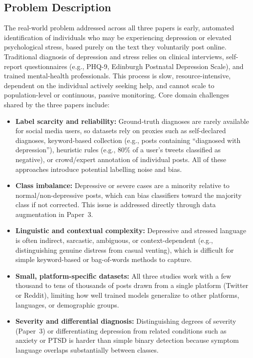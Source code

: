 \documentclass[a4paper,12pt]{article}
\begin{document}
\subsection{Problem Description}
The real-world problem addressed across all three papers is early, automated identification of individuals who may be experiencing depression or elevated psychological stress, based purely on the text they voluntarily post online. Traditional diagnosis of depression and stress relies on clinical interviews, self-report questionnaires (e.g., PHQ-9, Edinburgh Postnatal Depression Scale), and trained mental-health professionals. This process is slow, resource-intensive, dependent on the individual actively seeking help, and cannot scale to population-level or continuous, passive monitoring.
Core domain challenges shared by the three papers include:

\begin{itemize}
    \item \textbf{Label scarcity and reliability:} Ground-truth diagnoses are rarely available for social media users, so datasets rely on proxies such as self-declared diagnoses, keyword-based collection (e.g., posts containing ``diagnosed with depression''), heuristic rules (e.g., 80\% of a user's tweets classified as negative), or crowd/expert annotation of individual posts. All of these approaches introduce potential labelling noise and bias.

    \item \textbf{Class imbalance:} Depressive or severe cases are a minority relative to normal/non-depressive posts, which can bias classifiers toward the majority class if not corrected. This issue is addressed directly through data augmentation in Paper~3.

    \item \textbf{Linguistic and contextual complexity:} Depressive and stressed language is often indirect, sarcastic, ambiguous, or context-dependent (e.g., distinguishing genuine distress from casual venting), which is difficult for simple keyword-based or bag-of-words methods to capture.

    \item \textbf{Small, platform-specific datasets:} All three studies work with a few thousand to tens of thousands of posts drawn from a single platform (Twitter or Reddit), limiting how well trained models generalize to other platforms, languages, or demographic groups.

    \item \textbf{Severity and differential diagnosis:} Distinguishing degrees of severity (Paper~3) or differentiating depression from related conditions such as anxiety or PTSD is harder than simple binary detection because symptom language overlaps substantially between classes.
\end{itemize}
\end{document}
